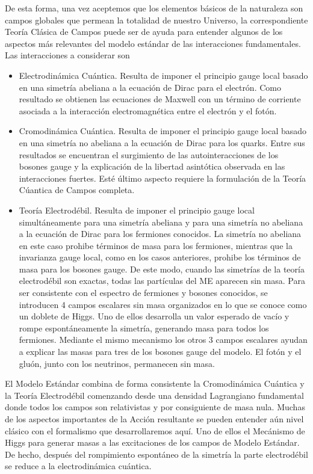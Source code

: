De esta forma, una vez aceptemos que los elementos básicos de la naturaleza son campos globales que permean la totalidad de nuestro Universo, la correspondiente Teoría Clásica de Campos puede ser de ayuda para entender algunos de los aspectos más relevantes del modelo estándar de las interacciones fundamentales. Las interacciones a considerar son
\begin{itemize}
\item Electrodinámica Cuántica. Resulta de imponer el principio gauge
  local basado en una simetría abeliana a la ecuación de Dirac para el
  electrón. Como resultado se obtienen las ecuaciones de Maxwell con
  un término de corriente asociada a la interacción electromagnética
  entre el electrón y el fotón.
\item Cromodinámica Cuántica. Resulta de imponer el principio gauge
  local basado en una simetría no abeliana a la ecuación de Dirac para
  los quarks. Entre sus resultados se encuentran el surgimiento de las
  autointeracciones de los bosones gauge y la  explicación de la libertad asintótica
  observada en las interacciones fuertes. Esté último aspecto requiere la formulación de la Teoría Cúantica de Campos completa.
\item Teoría Electrodébil. Resulta de imponer el principio gauge local
  simultáneamente para una simetría abeliana y para una simetría no
  abeliana a la ecuación de Dirac para los fermiones conocidos. La
  simetría no abeliana en este caso prohibe términos de masa para los
  fermiones, mientras que la invarianza gauge local, como en los casos
  anteriores, prohibe los términos de masa para los bosones gauge. De
  este modo, cuando las simetrías de la teoría electrodébil son
  exactas, todas las partículas del ME aparecen sin masa. Para ser
  consistente con el espectro de fermiones y bosones conocidos, se
  introducen 4 campos escalares sin masa organizados en lo que se
  conoce como un doblete de Higgs. Uno de ellos desarrolla un valor
  esperado de vacío y rompe espontáneamente la simetría, generando
  masa para todos los fermiones. Mediante el mismo mecanismo los otros
  3 campos escalares ayudan a explicar las masas para tres de los
  bosones gauge del modelo. El fotón y el gluón, junto con los
  neutrinos, permanecen sin masa.
\end{itemize} %

El Modelo Estándar combina de forma consistente la Cromodinámica
Cuántica y la Teoría Electrodébil comenzando desde una densidad
Lagrangiano fundamental donde todos los campos son relativistas y por
consiguiente de masa nula. Muchas de los aspectos importantes de la
Acción resultante se pueden entender aún nivel clásico con el
formalismo que desarrollaremos aquí.  Uno de ellos el Mecánismo de
Higgs para generar masas a las excitaciones de los campos de Modelo
Estándar. De hecho, después del rompimiento espontáneo de la simetría
la parte electrodébil se reduce a la electrodinámica cuántica. 

